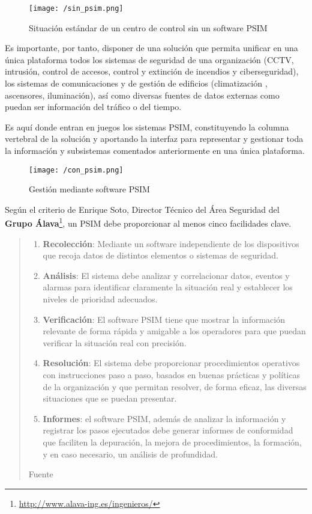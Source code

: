 \begin{figure}[h]
\centering
\texttt{[image: /sin\_psim.png]}
\caption{Situación estándar de un centro de control sin un software \acs{PSIM} ~\cite{PSIM_EnriqueSoto}}
\label{fig:sin_psim}
\end{figure}

Es importante, por tanto, disponer de una solución que permita unificar en una única plataforma todos los sistemas de seguridad de una organización (\acs{CCTV}, intrusión, control de accesos, control y extinción de incendios y ciberseguridad), los sistemas de comunicaciones y de gestión de edificios (climatización , ascensores, iluminación), así como diversas fuentes de datos externas como puedan ser información del tráfico o del tiempo.

Es aquí donde entran en juegos los sistemas \acf{PSIM}, constituyendo la columna vertebral de la solución y aportando la interfaz para representar y gestionar toda la información y subsistemas comentados anteriormente en una única plataforma.

\begin{figure}[h]
\centering
\texttt{[image: /con\_psim.png]}
\caption{Gestión mediante software \acs{PSIM}~\cite{PSIM_EnriqueSoto}}
\label{fig:con_psim}
\end{figure}

Según el criterio de Enrique Soto, Director Técnico del Área Seguridad del \textbf{Grupo Álava}\footnote{\url{http://www.alava-ing.es/ingenieros/}}, un \acs{PSIM} debe proporcionar al menos cinco facilidades clave.

\begin{quote}
{\itshape
\begin{enumerate}
\item \textbf{Recolección}: Mediante un software independiente de los dispositivos que recoja datos de distintos elementos o sistemas de seguridad.
\item \textbf{Análisis}: El sistema debe analizar y correlacionar datos, eventos y alarmas para identificar claramente la situación real y establecer los niveles de prioridad adecuados.
\item \textbf{Verificación}: El software \acs{PSIM} tiene que mostrar la información relevante de forma rápida y amigable a los operadores para que puedan verificar la situación real con precisión.
\item \textbf{Resolución}: El sistema debe proporcionar procedimientos operativos con instrucciones paso a paso, basados en buenas prácticas y políticas de la organización y que permitan resolver, de forma eficaz, las diversas situaciones que se puedan presentar.
\item \textbf{Informes}: el software \acs{PSIM}, además de analizar la información y registrar los pasos ejecutados debe generar informes de conformidad que faciliten la depuración, la mejora de procedimientos, la formación, y en caso necesario, un análisis de profundidad.
\end{enumerate}
}
\nopagebreak
\par\nointerlineskip\noindent\hfill Fuente~\cite{PSIM_EnriqueSoto}
\end{quote}

